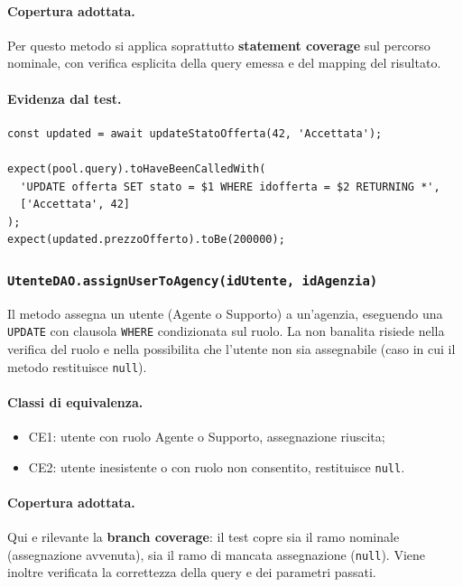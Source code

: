 \documentclass[a4paper,11pt]{article}
\begin{document}
\paragraph{Copertura adottata.}
Per questo metodo si applica soprattutto \textbf{statement coverage} sul percorso nominale, con verifica esplicita della query emessa e del mapping del risultato.

\paragraph{Evidenza dal test.}
\begin{lstlisting}[style=projectcode]
const updated = await updateStatoOfferta(42, 'Accettata');

expect(pool.query).toHaveBeenCalledWith(
  'UPDATE offerta SET stato = $1 WHERE idofferta = $2 RETURNING *',
  ['Accettata', 42]
);
expect(updated.prezzoOfferto).toBe(200000);
\end{lstlisting}

\subsubsection{\texttt{UtenteDAO.assignUserToAgency(idUtente, idAgenzia)}}
Il metodo assegna un utente (Agente o Supporto) a un'agenzia, eseguendo una \texttt{UPDATE} con clausola \texttt{WHERE} condizionata sul ruolo. La non banalita risiede nella verifica del ruolo e nella possibilita che l'utente non sia assegnabile (caso in cui il metodo restituisce \texttt{null}).

\paragraph{Classi di equivalenza.}
\begin{itemize}
  \item CE1: utente con ruolo Agente o Supporto, assegnazione riuscita;
  \item CE2: utente inesistente o con ruolo non consentito, restituisce \texttt{null}.
\end{itemize}

\paragraph{Copertura adottata.}
Qui e rilevante la \textbf{branch coverage}: il test copre sia il ramo nominale (assegnazione avvenuta), sia il ramo di mancata assegnazione (\texttt{null}). Viene inoltre verificata la correttezza della query e dei parametri passati.
\end{document}
